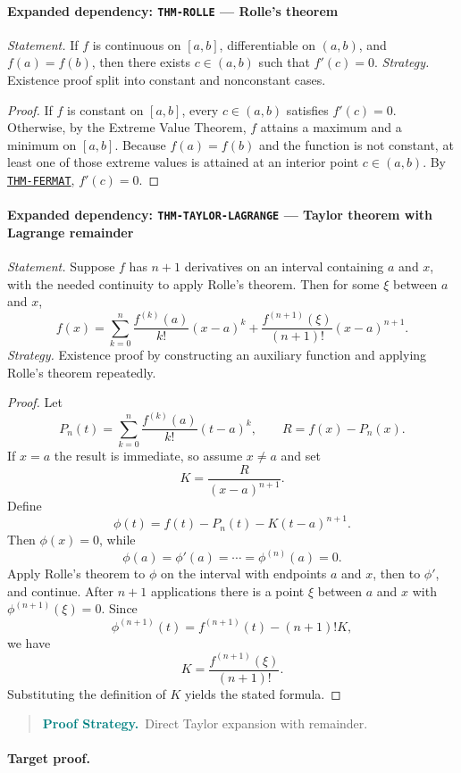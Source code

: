 \documentclass[10pt]{article}
\newcommand{\pidraw}[1]{\begingroup\urlstyle{tt}\nolinkurl{#1}\endgroup}
\newcommand{\pidref}[1]{\hyperref[prf:#1]{\pidraw{#1}}}
\newcommand{\pid}[1]{\pidref{#1}}
\theoremstyle{definition}
\theoremstyle{remark}
\newenvironment{proofstrategy}
{\begin{quote}\small\noindent\textbf{\textcolor{teal}{Proof Strategy.}}\ }
{\end{quote}}
\begin{document}
\paragraph{Expanded dependency: \pidraw{THM-ROLLE} --- Rolle's theorem}
\textit{Statement.} If $f$ is continuous on $[a,b]$, differentiable on $(a,b)$, and $f(a)=f(b)$, then there exists $c\in(a,b)$ such that $f'(c)=0$.
\textit{Strategy.} Existence proof split into constant and nonconstant cases.
\begin{proof}If $f$ is constant on $[a,b]$, every $c\in(a,b)$ satisfies $f'(c)=0$.
Otherwise, by the Extreme Value Theorem, $f$ attains a maximum and a minimum
on $[a,b]$. Because $f(a)=f(b)$ and the function is not constant, at least one
of those extreme values is attained at an interior point $c\in(a,b)$.
By \pid{THM-FERMAT}, $f'(c)=0$.\end{proof}

\paragraph{Expanded dependency: \pidraw{THM-TAYLOR-LAGRANGE} --- Taylor theorem with Lagrange remainder}
\textit{Statement.} Suppose $f$ has $n+1$ derivatives on an interval containing $a$ and $x$, with the needed continuity to apply Rolle's theorem. Then for some $\xi$ between $a$ and $x$,
\[
f(x)=\sum_{k=0}^{n}\frac{f^{(k)}(a)}{k!}(x-a)^k
+\frac{f^{(n+1)}(\xi)}{(n+1)!}(x-a)^{n+1}.
\]
\textit{Strategy.} Existence proof by constructing an auxiliary function and applying Rolle's theorem repeatedly.
\begin{proof}Let
\[
P_n(t)=\sum_{k=0}^{n}\frac{f^{(k)}(a)}{k!}(t-a)^k,
\qquad
R=f(x)-P_n(x).
\]
If $x=a$ the result is immediate, so assume $x\ne a$ and set
\[
K=\frac{R}{(x-a)^{n+1}}.
\]
Define
\[
\phi(t)=f(t)-P_n(t)-K(t-a)^{n+1}.
\]
Then $\phi(x)=0$, while
\[
\phi(a)=\phi'(a)=\cdots=\phi^{(n)}(a)=0.
\]
Apply Rolle's theorem to $\phi$ on the interval with endpoints $a$ and $x$,
then to $\phi'$, and continue. After $n+1$ applications there is a point
$\xi$ between $a$ and $x$ with $\phi^{(n+1)}(\xi)=0$. Since
\[
\phi^{(n+1)}(t)=f^{(n+1)}(t)-(n+1)!K,
\]
we have
\[
K=\frac{f^{(n+1)}(\xi)}{(n+1)!}.
\]
Substituting the definition of $K$ yields the stated formula.\end{proof}

\begin{proofstrategy}Direct Taylor expansion with remainder.\end{proofstrategy}

\paragraph{Target proof.}
\end{document}
